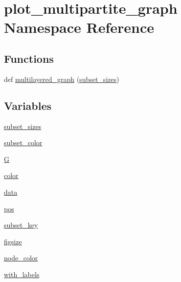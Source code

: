 \hypertarget{namespaceplot__multipartite__graph}{}\section{plot\+\_\+multipartite\+\_\+graph Namespace Reference}
\label{namespaceplot__multipartite__graph}
\subsection*{Functions}
\begin{DoxyCompactItemize}
\item 
def \hyperlink{namespaceplot__multipartite__graph_aa86f8d2a41fb3cb3b402f763ed543874}{multilayered\+\_\+graph} (\hyperlink{namespaceplot__multipartite__graph_acdd941e14e95edcaccf29ff742036c3c}{subset\+\_\+sizes})
\end{DoxyCompactItemize}
\subsection*{Variables}
\begin{DoxyCompactItemize}
\item 
\hyperlink{namespaceplot__multipartite__graph_acdd941e14e95edcaccf29ff742036c3c}{subset\+\_\+sizes}
\item 
\hyperlink{namespaceplot__multipartite__graph_a7f3ce7512c78ea8efd6fc8de67317c5d}{subset\+\_\+color}
\item 
\hyperlink{namespaceplot__multipartite__graph_a7e5604423519fe46701264fff501592f}{G}
\item 
\hyperlink{namespaceplot__multipartite__graph_ac7dc58589f8f00e46b548e31ae4dd0cf}{color}
\item 
\hyperlink{namespaceplot__multipartite__graph_a8fc9fc2cc6d1de633efb91144147f40d}{data}
\item 
\hyperlink{namespaceplot__multipartite__graph_a8a498337e2ba8df62181908fa5d8e820}{pos}
\item 
\hyperlink{namespaceplot__multipartite__graph_ac0ec5cce10b31180785490cd70930ea5}{subset\+\_\+key}
\item 
\hyperlink{namespaceplot__multipartite__graph_a22a7a679f8e9340d278ba9658598c07a}{figsize}
\item 
\hyperlink{namespaceplot__multipartite__graph_ab6fddeb7dbc86d76e3419ac2f6a82bc4}{node\+\_\+color}
\item 
\hyperlink{namespaceplot__multipartite__graph_a48f1627ed510ddcbb219772ca147edb7}{with\+\_\+labels}
\end{DoxyCompactItemize}



